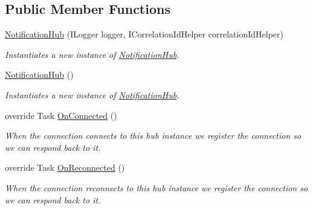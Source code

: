\subsection*{Public Member Functions}
\begin{DoxyCompactItemize}
\item 
\hyperlink{classCqrs_1_1WebApi_1_1SignalR_1_1Hubs_1_1NotificationHub_aeb3d9f4d90baeb103231c5c47a13e00d_aeb3d9f4d90baeb103231c5c47a13e00d}{Notification\+Hub} (I\+Logger logger, I\+Correlation\+Id\+Helper correlation\+Id\+Helper)
\begin{DoxyCompactList}\small\item\em Instantiates a new instance of \hyperlink{classCqrs_1_1WebApi_1_1SignalR_1_1Hubs_1_1NotificationHub}{Notification\+Hub}. \end{DoxyCompactList}\item 
\hyperlink{classCqrs_1_1WebApi_1_1SignalR_1_1Hubs_1_1NotificationHub_a83b123b045c22ce5bcaee79168cca10a_a83b123b045c22ce5bcaee79168cca10a}{Notification\+Hub} ()
\begin{DoxyCompactList}\small\item\em Instantiates a new instance of \hyperlink{classCqrs_1_1WebApi_1_1SignalR_1_1Hubs_1_1NotificationHub}{Notification\+Hub}. \end{DoxyCompactList}\item 
override Task \hyperlink{classCqrs_1_1WebApi_1_1SignalR_1_1Hubs_1_1NotificationHub_a0188fd4fea68476ffc3b375482c7b56c_a0188fd4fea68476ffc3b375482c7b56c}{On\+Connected} ()
\begin{DoxyCompactList}\small\item\em When the connection connects to this hub instance we register the connection so we can respond back to it. \end{DoxyCompactList}\item 
override Task \hyperlink{classCqrs_1_1WebApi_1_1SignalR_1_1Hubs_1_1NotificationHub_acaadcc7cc9f00c184e12b6bb725a2167_acaadcc7cc9f00c184e12b6bb725a2167}{On\+Reconnected} ()
\begin{DoxyCompactList}\small\item\em When the connection reconnects to this hub instance we register the connection so we can respond back to it. \end{DoxyCompactList}\end{DoxyCompactItemize}
